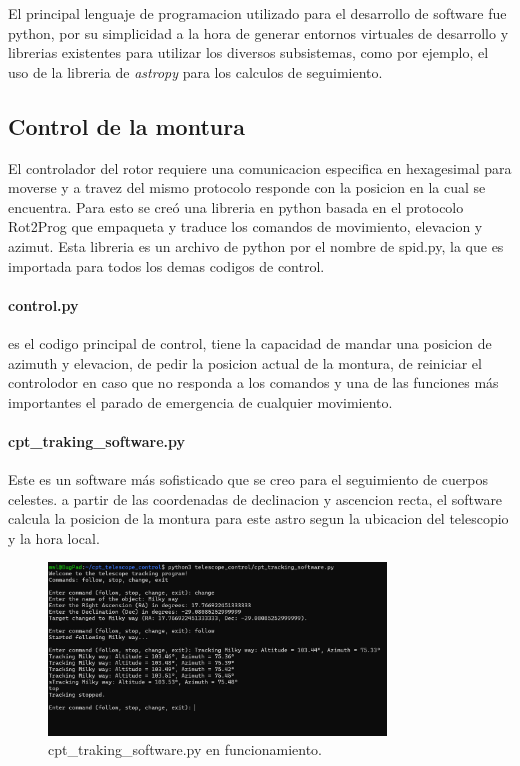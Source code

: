 El principal lenguaje de programacion utilizado para el desarrollo de software fue python, por su simplicidad a la hora de generar entornos virtuales de desarrollo y librerias existentes para utilizar los diversos subsistemas, como por ejemplo, el uso de la libreria de \textit{astropy} para los calculos de seguimiento.\\

\subsection{Control de la montura}

El controlador del rotor requiere una comunicacion especifica en hexagesimal para moverse y a travez del mismo protocolo responde con la posicion en la cual se encuentra. Para esto se creó una libreria en python basada en el protocolo Rot2Prog\cite{Rot2Prog} que empaqueta y traduce los comandos de movimiento, elevacion y azimut. Esta libreria es un archivo de python por el nombre de spid.py, la que es importada para todos los demas codigos de control.\\

\paragraph{control.py} es el codigo principal de control, tiene la capacidad de mandar una posicion de azimuth y elevacion, de pedir la posicion actual de la montura, de reiniciar el controlodor en caso que no responda a los comandos y una de las funciones más importantes el parado de emergencia de cualquier movimiento.\\

\paragraph{cpt\_traking\_software.py} Este es un software más sofisticado que se creo para el seguimiento de cuerpos celestes. a partir de las coordenadas de declinacion y ascencion recta, el software calcula la posicion de la montura para este astro segun la ubicacion del telescopio y la hora local.\\

\begin{figure}
    \centering
    \includegraphics[width=0.8\textwidth]{img/traking}
    \caption{cpt\_traking\_software.py en funcionamiento.}
    \label{fig:control}
\end{figure}

